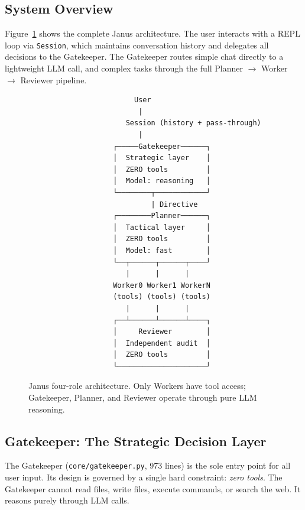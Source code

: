 \documentclass[11pt,a4paper]{article}
\begin{document}
\subsection{System Overview}

Figure~\ref{fig:architecture} shows the complete Janus architecture.
The user interacts with a REPL loop via \texttt{Session}, which maintains
conversation history and delegates all decisions to the Gatekeeper.
The Gatekeeper routes simple chat directly to a lightweight LLM call, and
complex tasks through the full Planner $\rightarrow$ Worker $\rightarrow$
Reviewer pipeline.

\begin{figure}[H]
\centering
\begin{verbatim}
                         User
                          |
                       Session (history + pass-through)
                          |
                    ┌─────Gatekeeper──────┐
                    │  Strategic layer    │
                    │  ZERO tools         │
                    │  Model: reasoning   │
                    └────────┬────────────┘
                             | Directive
                    ┌────────Planner──────┐
                    │  Tactical layer     │
                    │  ZERO tools         │
                    │  Model: fast        │
                    └──┬──────┬──────┬────┘
                       |      |      |
                    Worker0 Worker1 WorkerN
                    (tools) (tools) (tools)
                       |      |      |
                    ┌──┴──────┴──────┴────┐
                    │     Reviewer        │
                    │  Independent audit  │
                    │  ZERO tools         │
                    └─────────────────────┘
\end{verbatim}
\caption{Janus four-role architecture. Only Workers have tool access;
Gatekeeper, Planner, and Reviewer operate through pure LLM reasoning.}
\label{fig:architecture}
\end{figure}

\subsection{Gatekeeper: The Strategic Decision Layer}

The Gatekeeper (\texttt{core/gatekeeper.py}, 973 lines) is the sole entry
point for all user input. Its design is governed by a single hard constraint:
\emph{zero tools}. The Gatekeeper cannot read files, write files, execute
commands, or search the web. It reasons purely through LLM calls.
\end{document}
